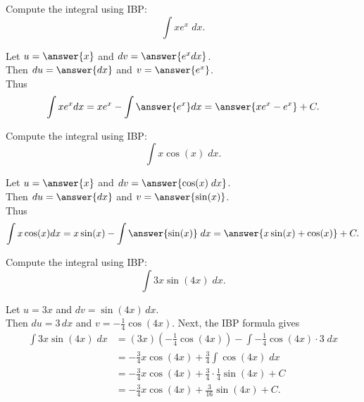 \documentclass{ximera}
\begin{document}
\begin{center}
\begin{foldable}
\end{foldable}
\end{center}


\begin{problem} %
  Compute the integral using IBP:
  \[
  \int xe^x \;dx.
  \]
  
  Let $u = \answer{x}$   and   $dv = \answer{e^x dx}$.\\
  Then $du = \answer{dx}$   and   $v = \answer{e^x}$.\\
  Thus 
  \[
  \int xe^x dx = xe^x - \int \answer{e^x} dx = \answer{xe^x - e^x} + C.
  \]
  


    

\end{problem}


\begin{problem} %
  Compute the integral using IBP:
  \[
  \int x\cos(x) \;dx.
  \]
  
  Let $u = \answer{x}$   and   $dv = \answer{\cos(x) \;dx}$.\\
  Then $du = \answer{dx}$   and   $v = \answer{\sin(x)}$.\\
  Thus 
  \[
  \int x\cos(x) dx = x\sin(x) - \int \answer{\sin(x)} \;dx = \answer{x\sin(x) + \cos(x)} + C.
  \]
  


    

\end{problem}


\begin{example}
Compute the integral using IBP:
  \[
  \int 3x\sin(4x) \;dx.
  \]

Let $u = 3x$ and $dv = \sin(4x) \,dx$.\\
Then $du = 3 \,dx$ and $v = -\frac14 \cos(4x)$.
Next, the IBP formula gives
\begin{align*}
  \int 3x\sin(4x) \;dx &= (3x)(-\frac14 \cos(4x)) - \int -\frac14 \cos(4x) \cdot 3 \; dx \\
                       &= -\frac34 x\cos(4x) + \frac34 \int \cos(4x) \; dx \\
                       &= -\frac34 x\cos(4x) + \frac34 \cdot \frac 14 \sin(4x) + C\\
                       &= -\frac34 x\cos(4x) + \frac{3}{16}\sin(4x) + C.
\end{align*}

\end{example}
\end{document}
